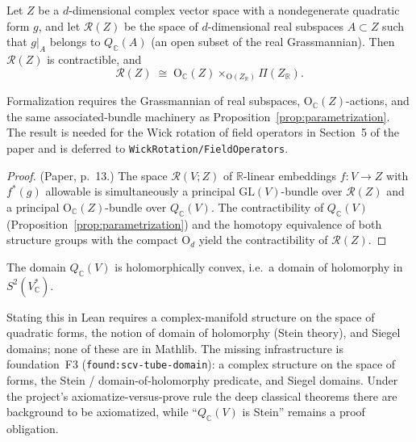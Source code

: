 \begin{proposition}
  \label{prop:real-subspaces}
  \notready
  Let $Z$ be a $d$-dimensional complex vector space with a nondegenerate
  quadratic form $g$, and let $\mathcal R(Z)$ be the space of
  $d$-dimensional real subspaces $A \subset Z$ such that $g|_A$ belongs to
  $Q_{\mathbb C}(A)$ (an open subset of the real Grassmannian). Then
  $\mathcal R(Z)$ is contractible, and
  \[
    \mathcal R(Z) \;\cong\;
    \mathrm{O}_{\mathbb C}(Z) \times_{\mathrm{O}(Z_{\mathbb R})}
    \Pi(Z_{\mathbb R}).
  \]

  Formalization requires the Grassmannian of real subspaces,
  $\mathrm{O}_{\mathbb C}(Z)$-actions, and the same associated-bundle
  machinery as Proposition~\ref{prop:parametrization}. The result is needed
  for the Wick rotation of field operators in Section~5 of the paper and is
  deferred to \texttt{WickRotation/FieldOperators}.
\end{proposition}

\begin{proof}
  (Paper, p.~13.) The space $\mathcal R(V; Z)$ of $\mathbb R$-linear
  embeddings $f \colon V \to Z$ with $f^*(g)$ allowable is simultaneously a
  principal $\mathrm{GL}(V)$-bundle over $\mathcal R(Z)$ and a principal
  $\mathrm{O}_{\mathbb C}(Z)$-bundle over $Q_{\mathbb C}(V)$. The
  contractibility of $Q_{\mathbb C}(V)$
  (Proposition~\ref{prop:parametrization}) and the homotopy equivalence of
  both structure groups with the compact $\mathrm O_d$ yield the
  contractibility of $\mathcal R(Z)$.
\end{proof}

\begin{proposition}
  \label{prop:domain-holomorphy}
  \notready
  The domain $Q_{\mathbb C}(V)$ is holomorphically convex, i.e.\ a domain of
  holomorphy in $S^2(V^*_{\mathbb C})$.

  Stating this in Lean requires a complex-manifold structure on the space of
  quadratic forms, the notion of domain of holomorphy (Stein theory), and
  Siegel domains; none of these are in Mathlib. The missing infrastructure
  is foundation~F3 (\texttt{found:scv-tube-domain}): a complex structure on
  the space of forms, the Stein / domain-of-holomorphy predicate, and
  Siegel domains. Under the project's axiomatize-versus-prove rule the deep
  classical theorems there are background to be axiomatized, while
  ``$Q_{\mathbb C}(V)$ is Stein'' remains a proof obligation.
\end{proposition}


